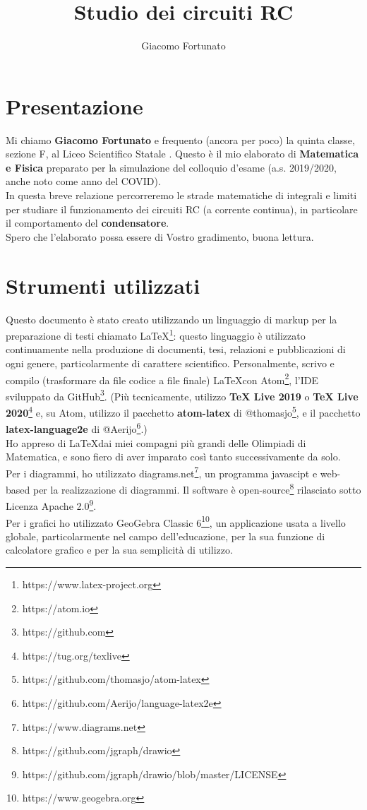 \documentclass[a3paper, twoside, openany]{book}
\title{Studio dei circuiti RC}
\author{Giacomo Fortunato}
\theoremstyle{definition}
\begin{document}
\maketitle
\section{Presentazione}
Mi chiamo \textbf{Giacomo Fortunato} e frequento (ancora per poco) la quinta classe, sezione F, al Liceo Scientifico Statale . Questo è il mio elaborato di \textbf{Matematica e Fisica} preparato per la simulazione del colloquio d'esame (a.s. 2019/2020, anche noto come anno del COVID). \\ In questa breve relazione percorreremo le strade matematiche di integrali e limiti per studiare il funzionamento dei circuiti RC (a corrente continua), in particolare il comportamento del \textbf{condensatore}. \\ Spero che l'elaborato possa essere di Vostro gradimento, buona lettura.
\section{Strumenti utilizzati}
Questo documento è stato creato utilizzando un linguaggio di markup per la preparazione di testi chiamato \LaTeX\footnote{https://www.latex-project.org}: questo linguaggio è utilizzato continuamente nella produzione di documenti, tesi, relazioni e pubblicazioni di ogni genere, particolarmente di carattere scientifico. Personalmente, scrivo e compilo (trasformare da file codice a file finale) \LaTeX con Atom\footnote{https://atom.io}, l'IDE sviluppato da GitHub\footnote{https://github.com}. (Più tecnicamente, utilizzo \textbf{TeX Live 2019} o \textbf{TeX Live 2020}\footnote{https://tug.org/texlive} e, su Atom, utilizzo il pacchetto \textbf{atom-latex} di @thomasjo\footnote{https://github.com/thomasjo/atom-latex}, e il pacchetto \mbox{\textbf{latex-language2e}} di @Aerijo\footnote{https://github.com/Aerijo/language-latex2e}.) \\ Ho appreso di \LaTeX dai miei compagni più grandi delle Olimpiadi di Matematica, e sono fiero di aver imparato così tanto successivamente da solo. \\ Per i diagrammi, ho utilizzato diagrams.net\footnote{https://www.diagrams.net}, un programma javascipt e web-based per la realizzazione di diagrammi. Il software è open-source\footnote{https://github.com/jgraph/drawio} rilasciato sotto Licenza Apache 2.0\footnote{https://github.com/jgraph/drawio/blob/master/LICENSE}. \\ Per i grafici ho utilizzato GeoGebra Classic 6\footnote{https://www.geogebra.org}, un applicazione usata a livello globale, particolarmente nel campo dell'educazione, per la sua funzione di calcolatore grafico e per la sua semplicità di utilizzo.
\end{document}
